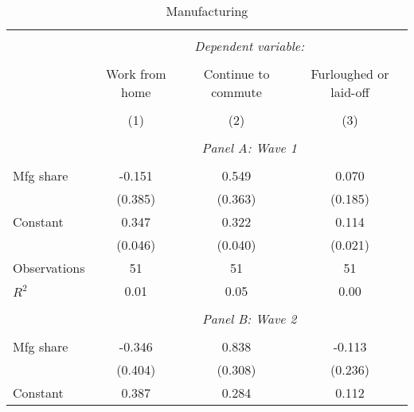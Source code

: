 \begin{table}[!htbp] \centering                    \caption{Manufacturing}                    \label{tab:priorindustrymanuf}                  \small                  \begin{tabular}{@{\extracolsep{5pt}}lccc}                  \\[-1.8ex]\hline                  \hline \\[-1.8ex]                   & \multicolumn{3}{c}{\textit{Dependent variable:}} \\                   \cline{2-4}                   \\[-1.8ex] & Work from home & Continue to commute & Furloughed or laid-off \\                   \hline \\[-1.8ex]               
                    &\multicolumn{1}{c}{(1)}         &\multicolumn{1}{c}{(2)}         &\multicolumn{1}{c}{(3)}         \\
\hline \\               & \multicolumn{3}{c}{\textit{Panel A: Wave 1}} \\               \addlinespace[1mm] \\
Mfg share       &      -0.151         &       0.549         &       0.070         \\
         &     (0.385)         &     (0.363)         &     (0.185)         \\
[1em]
Constant            &       0.347\sym{***}&       0.322\sym{***}&       0.114\sym{***}\\
                    &     (0.046)         &     (0.040)         &     (0.021)         \\
[1em]
Observations        &          51         &          51         &          51         \\
\(R^{2}\)           &        0.01         &        0.05         &        0.00         \\
\hline \\               & \multicolumn{3}{c}{\textit{Panel B: Wave 2}} \\               \addlinespace[1mm] \\
Mfg share        &      -0.346         &       0.838\sym{***}&      -0.113         \\
         &     (0.404)         &     (0.308)         &     (0.236)         \\
[1em]
Constant            &       0.387\sym{***}&       0.284\sym{***}&       0.112\sym{***}\\

\end{tabular}
\end{table}
